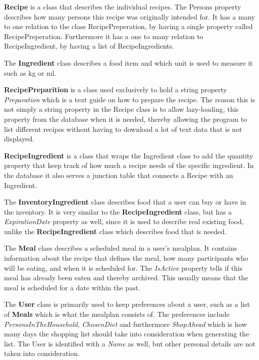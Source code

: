 \textbf{Recipe} is a class that describes the individual recipes. The Persons property describes how many persons this recipe was originally intended for. It has a many to one relation to the class RecipePreperation, by having a single property called RecipePreperation. Furthermore it has a one to many relation to RecipeIngredient, by having a list of RecipeIngredients.

The \textbf{Ingredient} class describes a food item and which unit is used to measure it such as kg or ml.

\textbf{RecipePreparition} is a class used exclusively to hold a string property \textit{Preparation} which is a text guide on how to prepare the recipe. The reason this is not simply a string property in the Recipe class is to allow lazy-loading, this property from the database when it is needed, thereby allowing the program to list different recipes without having to download a lot of text data that is not displayed.

\textbf{RecipeIngredient} is a class that wraps the Ingredient class to add the quantity property that keep track of how much a recipe needs of the specific ingredient. In the database it also serves a junction table that connects a Recipe with an Ingredient.

The \textbf{InventoryIngredient} class describes food that a user can buy or have in the inventory. It is very similar to the \textbf{RecipeIngredient} class, but has a \textit{ExpirationDate} property as well, since it is used to describe real existing food, unlike the \textbf{RecipeIngredient} class which describes food that is needed.

The \textbf{Meal} class describes a scheduled meal in a user's mealplan. It contains information about the recipe that defines the meal, how many participants who will be eating, and when it is scheduled for. The \textit{IsActive} property tells if this meal has already been eaten and thereby archived. This usually means that the meal is scheduled for a date within the past.

The \textbf{User} class is primarily used to keep preferences about a user, such as a list of \textbf{Meals} which is what the mealplan consists of. The preferences include \textit{PersonsInTheHousehold}, \textit{ChosenDiet} and furthermore \textit{ShopAhead} which is how many days the shopping list should take into consideration when generating the list. The User is identified with a \textit{Name} as well, but other personal details are not taken into consideration.

